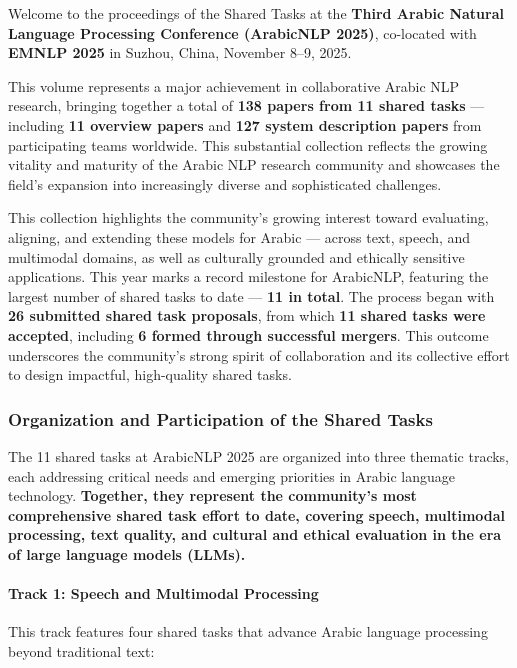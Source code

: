 Welcome to the proceedings of the Shared Tasks at the \textbf{Third Arabic Natural Language Processing Conference (ArabicNLP 2025)}, co-located with \textbf{EMNLP 2025} in Suzhou, China, November 8–9, 2025.


This volume represents a major achievement in collaborative Arabic NLP research, bringing together a total of \textbf{138 papers from 11 shared tasks} — including \textbf{11 overview papers} and \textbf{127 system description papers} from participating teams worldwide. This substantial collection reflects the growing vitality and maturity of the Arabic NLP research community and showcases the field’s expansion into increasingly diverse and sophisticated challenges.

This collection highlights the community’s growing interest toward evaluating, aligning, and extending these models for Arabic — across text, speech, and multimodal domains, as well as culturally grounded and ethically sensitive applications.
This year marks a record milestone for ArabicNLP, featuring the largest number of shared tasks to date — \textbf{11 in total}. The process began with \textbf{26 submitted shared task proposals}, from which \textbf{11 shared tasks were accepted}, including \textbf{6 formed through successful mergers}. This outcome underscores the community’s strong spirit of collaboration and its collective effort to design impactful, high-quality shared tasks.


\subsubsection*{Organization and Participation of the Shared Tasks}

The 11 shared tasks at ArabicNLP 2025 are organized into three thematic tracks, each addressing critical needs and emerging priorities in Arabic language technology. \textbf{Together, they represent the community’s most comprehensive shared task effort to date, covering speech, multimodal processing, text quality, and cultural and ethical evaluation in the era of large language models (LLMs).}

\paragraph{\textbf{Track 1: Speech and Multimodal Processing}}

This track features four shared tasks that advance Arabic language processing beyond traditional text:

